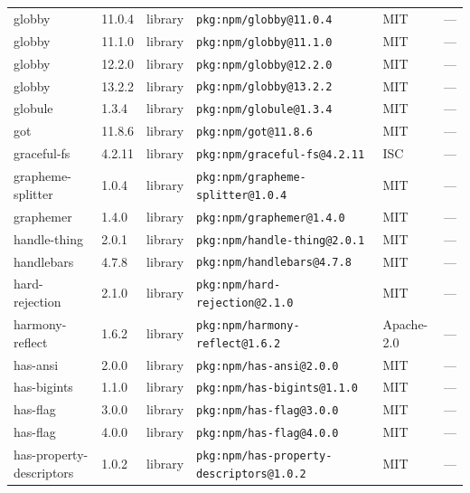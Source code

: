 \documentclass[11pt,a4paper]{article}
\begin{document}
\begin{longtable}{|p{4cm}|p{2cm}|p{1.6cm}|p{5cm}|p{1.5cm}|p{3.5cm}|}
\raggedright globby & 11.0.4 & library & \small\texttt{pkg:npm/globby@11.0.4} & MIT & \small — \\
\raggedright globby & 11.1.0 & library & \small\texttt{pkg:npm/globby@11.1.0} & MIT & \small — \\
\raggedright globby & 12.2.0 & library & \small\texttt{pkg:npm/globby@12.2.0} & MIT & \small — \\
\raggedright globby & 13.2.2 & library & \small\texttt{pkg:npm/globby@13.2.2} & MIT & \small — \\
\raggedright globule & 1.3.4 & library & \small\texttt{pkg:npm/globule@1.3.4} & MIT & \small — \\
\raggedright got & 11.8.6 & library & \small\texttt{pkg:npm/got@11.8.6} & MIT & \small — \\
\raggedright graceful-fs & 4.2.11 & library & \small\texttt{pkg:npm/graceful-fs@4.2.11} & ISC & \small — \\
\raggedright grapheme-splitter & 1.0.4 & library & \small\texttt{pkg:npm/grapheme-splitter@1.0.4} & MIT & \small — \\
\raggedright graphemer & 1.4.0 & library & \small\texttt{pkg:npm/graphemer@1.4.0} & MIT & \small — \\
\raggedright handle-thing & 2.0.1 & library & \small\texttt{pkg:npm/handle-thing@2.0.1} & MIT & \small — \\
\raggedright handlebars & 4.7.8 & library & \small\texttt{pkg:npm/handlebars@4.7.8} & MIT & \small — \\
\raggedright hard-rejection & 2.1.0 & library & \small\texttt{pkg:npm/hard-rejection@2.1.0} & MIT & \small — \\
\raggedright harmony-reflect & 1.6.2 & library & \small\texttt{pkg:npm/harmony-reflect@1.6.2} & Apache-2.0 & \small — \\
\raggedright has-ansi & 2.0.0 & library & \small\texttt{pkg:npm/has-ansi@2.0.0} & MIT & \small — \\
\raggedright has-bigints & 1.1.0 & library & \small\texttt{pkg:npm/has-bigints@1.1.0} & MIT & \small — \\
\raggedright has-flag & 3.0.0 & library & \small\texttt{pkg:npm/has-flag@3.0.0} & MIT & \small — \\
\raggedright has-flag & 4.0.0 & library & \small\texttt{pkg:npm/has-flag@4.0.0} & MIT & \small — \\
\raggedright has-property-descriptors & 1.0.2 & library & \small\texttt{pkg:npm/has-property-descriptors@1.0.2} & MIT & \small — \\

\end{longtable}
\end{document}
